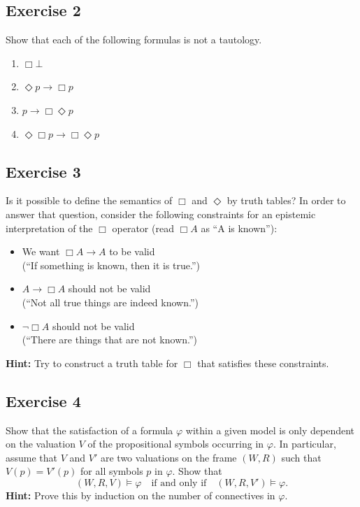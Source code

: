 \documentclass[11pt]{article}
\begin{document}
    \subsection{Exercise 2}\label{subsec:exercise-2}

    Show that each of the following formulas is not a tautology.
    \begin{enumerate}
        \item[(a)] $\Box \bot$
        \item[(b)] $\Diamond p \rightarrow \Box p$
        \item[(c)] $p \rightarrow \Box \Diamond p$
        \item[(d)] $\Diamond \Box p \rightarrow \Box \Diamond p$
    \end{enumerate}

    \subsection{Exercise 3}\label{subsec:exercise-3}

    Is it possible to define the semantics of $\Box$ and $\Diamond$ by truth tables?
    In order to answer that question, consider the following constraints for an epistemic interpretation of the $\Box$ operator (read $\Box A$ as ``A is known''):
    \begin{itemize}
        \item We want $\Box A \rightarrow A$ to be valid \\
        (``If something is known, then it is true.'')
        \item $A \rightarrow \Box A$ should not be valid \\
        (``Not all true things are indeed known.'')
        \item $\neg \Box A$ should not be valid \\
        (``There are things that are not known.'')
    \end{itemize}
    \textbf{Hint:} Try to construct a truth table for $\Box$ that satisfies these constraints.

    \subsection{Exercise 4}
    \label{subsec:exercise-4}

    Show that the satisfaction of a formula $\varphi$ within a given model is only dependent on the valuation $V$ of the propositional symbols occurring in $\varphi$. In particular, assume that $V$ and $V'$ are two valuations on the frame $(W, R)$ such that $V(p) = V'(p)$ for all symbols $p$ in $\varphi$. Show that
    \[
    (W, R, V) \models \varphi \quad \text{if and only if} \quad (W, R, V') \models \varphi.
    \]
    \textbf{Hint:} Prove this by induction on the number of connectives in $\varphi$.
\end{document}
